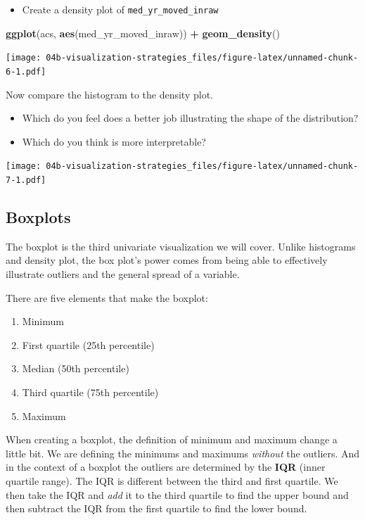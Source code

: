 \documentclass[
]{book}
\newenvironment{Shaded}{\begin{snugshade}}{\end{snugshade}}
\newcommand{\KeywordTok}[1]{\textcolor[rgb]{0.13,0.29,0.53}{\textbf{#1}}}
\newcommand{\NormalTok}[1]{#1}
\newcommand{\OperatorTok}[1]{\textcolor[rgb]{0.81,0.36,0.00}{\textbf{#1}}}
\newcommand{\StringTok}[1]{\textcolor[rgb]{0.31,0.60,0.02}{#1}}
\providecommand{\tightlist}{%
  \setlength{\itemsep}{0pt}\setlength{\parskip}{0pt}}
\begin{document}
\begin{itemize}
\tightlist
\item
  Create a density plot of \texttt{med\_yr\_moved\_inraw}
\end{itemize}

\begin{Shaded}
\begin{Highlighting}[]
\KeywordTok{ggplot}\NormalTok{(acs, }\KeywordTok{aes}\NormalTok{(med\_yr\_moved\_inraw)) }\OperatorTok{+}
\StringTok{  }\KeywordTok{geom\_density}\NormalTok{()}
\end{Highlighting}
\end{Shaded}

\texttt{[image: 04b-visualization-strategies\_files/figure-latex/unnamed-chunk-6-1.pdf]}

Now compare the histogram to the density plot.

\begin{itemize}
\tightlist
\item
  Which do you feel does a better job illustrating the shape of the distribution?
\item
  Which do you think is more interpretable?
\end{itemize}

\texttt{[image: 04b-visualization-strategies\_files/figure-latex/unnamed-chunk-7-1.pdf]}

\hypertarget{boxplots}{%
\subsection{Boxplots}\label{boxplots}}

The boxplot is the third univariate visualization we will cover. Unlike histograms and density plot, the box plot's power comes from being able to effectively illustrate outliers and the general spread of a variable.

There are five elements that make the boxplot:

\begin{enumerate}
\def\labelenumi{\arabic{enumi}.}
\tightlist
\item
  Minimum
\item
  First quartile (25th percentile)
\item
  Median (50th percentile)
\item
  Third quartile (75th percentile)
\item
  Maximum
\end{enumerate}

When creating a boxplot, the definition of minimum and maximum change a little bit. We are defining the minimums and maximums \emph{without} the outliers. And in the context of a boxplot the outliers are determined by the \textbf{IQR} (inner quartile range). The IQR is different between the third and first quartile. We then take the IQR and \emph{add} it to the third quartile to find the upper bound and then subtract the IQR from the first quartile to find the lower bound.
\end{document}
